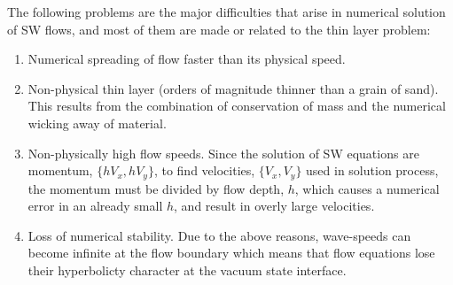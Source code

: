 \documentclass[letterpaper,10pt]{article}
\begin{document}
The following problems are the major difficulties that arise in numerical solution of SW flows, and most of them are made or related to the thin layer problem:

\begin{enumerate}
\item \label{problemwicking}
      Numerical spreading of flow faster than its physical speed.      
\item \label{problemtoothin}
      Non-physical thin layer (orders of magnitude thinner than a grain of sand). This results from the combination of conservation of mass and the numerical wicking away of material.
\item \label{problemtoofast}
      Non-physically high flow speeds.  Since the solution of SW equations are momentum, $\{hV_x,hV_y\}$, to find velocities, $\{V_x,V_y\}$ used in solution process, the momentum must be divided by flow depth, $h$, which causes a numerical error in an already small $h$, and result in overly large velocities.
\item \label{problemunstable}
      Loss of numerical stability.  Due to the above reasons, wave-speeds can become infinite at the flow boundary which means that flow equations lose their hyperbolicty character at the vacuum state interface.
\end{enumerate}\label{thinprob}
\end{document}
